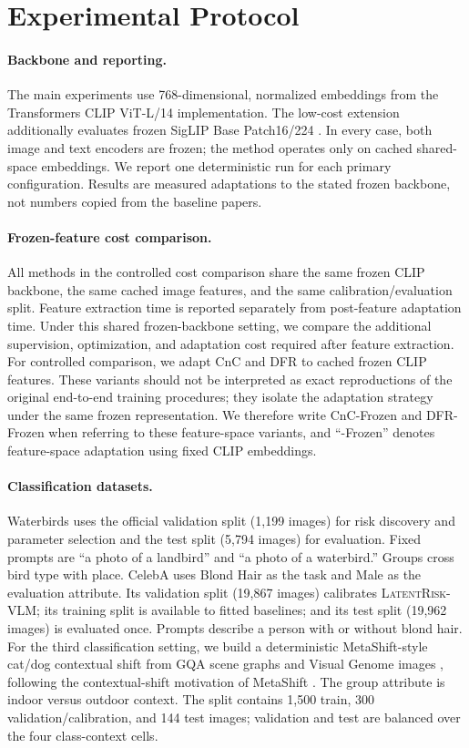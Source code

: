 \section{Experimental Protocol}
\paragraph{Backbone and reporting.}
The main experiments use 768-dimensional, normalized embeddings from the Transformers CLIP ViT-L/14 implementation. The low-cost extension additionally evaluates frozen SigLIP Base Patch16/224 \citep{zhai2023sigmoid}. In every case, both image and text encoders are frozen; the method operates only on cached shared-space embeddings. We report one deterministic run for each primary configuration. Results are measured adaptations to the stated frozen backbone, not numbers copied from the baseline papers.

\paragraph{Frozen-feature cost comparison.}
All methods in the controlled cost comparison share the same frozen CLIP backbone, the same cached image features, and the same calibration/evaluation split. Feature extraction time is reported separately from post-feature adaptation time. Under this shared frozen-backbone setting, we compare the additional supervision, optimization, and adaptation cost required after feature extraction. For controlled comparison, we adapt CnC and DFR to cached frozen CLIP features. These variants should not be interpreted as exact reproductions of the original end-to-end training procedures; they isolate the adaptation strategy under the same frozen representation. We therefore write CnC-Frozen and DFR-Frozen when referring to these feature-space variants, and ``-Frozen'' denotes feature-space adaptation using fixed CLIP embeddings.

\paragraph{Classification datasets.}
Waterbirds \citep{sagawa2020groupdro} uses the official validation split (1,199 images) for risk discovery and parameter selection and the test split (5,794 images) for evaluation. Fixed prompts are ``a photo of a landbird'' and ``a photo of a waterbird.'' Groups cross bird type with place. CelebA \citep{liu2015faceattributes} uses Blond Hair as the task and Male as the evaluation attribute. Its validation split (19,867 images) calibrates \textsc{LatentRisk-VLM}; its training split is available to fitted baselines; and its test split (19,962 images) is evaluated once. Prompts describe a person with or without blond hair. For the third classification setting, we build a deterministic MetaShift-style cat/dog contextual shift from GQA scene graphs \citep{hudson2019gqa} and Visual Genome images \citep{krishna2017visualgenome}, following the contextual-shift motivation of MetaShift \citep{liang2022metashift}. The group attribute is indoor versus outdoor context. The split contains 1,500 train, 300 validation/calibration, and 144 test images; validation and test are balanced over the four class-context cells.

